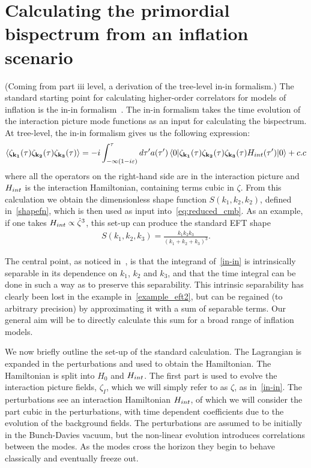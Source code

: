     \section{Calculating the primordial bispectrum from an inflation scenario}
    (Coming from part iii level, a derivation of the tree-level in-in formalism.)
    The standard starting point for calculating
higher-order correlators for models of inflation is the in-in formalism~\cite{Maldacena,weinberg_in_in}.
The in-in formalism takes the time evolution of the interaction picture mode
functions as an input for calculating the bispectrum.
At tree-level, the in-in formalism gives us the
following expression:
\begin{align}
{
    \left< \zeta_{\mathbf{k_1}}(\tau)\zeta_{\mathbf{k_2}}(\tau)\zeta_{\mathbf{k_3}}(\tau) \right>
=-i\int_{-\infty(1-i\varepsilon)}^{\tau}d\tau'a(\tau')
    \left<0\lvert \zeta_{\mathbf{k_1}}(\tau)\zeta_{\mathbf{k_2}}(\tau)\zeta_{\mathbf{k_3}}(\tau)H_{int}(\tau') \rvert0\right>+c.c\label{in-in}
}
\end{align}
where all the operators on the right-hand side are in the interaction picture
and $H_{int}$ is the interaction Hamiltonian, containing terms cubic in $\zeta$.
From this calculation we obtain the dimensionless shape function $S(k_1,k_2,k_2)$,
defined in~\eqref{shapefn},
which is then used as input into~\eqref{eq:reduced_cmb}.
As an example, if one takes $H_{int}\propto\dot{\zeta}^3$, this set-up can produce the standard EFT shape
\begin{align}\label{example_eft2}
    S(k_1, k_2, k_3) = \frac{k_1k_2k_3}{(k_1+k_2+k_3)^3}.
\end{align}

The central point, as noticed in~\cite{Funakoshi}, is that the
integrand of~\eqref{in-in} is intrinsically separable
in its dependence on $k_1$, $k_2$ and $k_3$, and that the time integral
can be done in such a way as to preserve this separability.
This intrinsic separability has clearly been lost in
the example in~\eqref{example_eft2},
but can be regained (to arbitrary precision) by approximating it
with a sum of separable terms. Our general aim will be to directly calculate
this sum for a broad range of inflation models.

We now briefly outline the set-up of the standard calculation.
The Lagrangian is expanded in the perturbations and used to obtain the Hamiltonian.
The Hamiltonian is split into $H_0$ and $H_{int}$.
The first part is used to evolve the interaction picture fields, $\zeta_I$,
which we will simply refer to as $\zeta$, as in~\eqref{in-in}.
The perturbations see an interaction Hamiltonian $H_{int}$,
of which we will consider the part cubic in the perturbations,
with time dependent coefficients due to the evolution of the background fields.
The perturbations are assumed to be initially in the Bunch-Davies vacuum,
but the non-linear
evolution introduces correlations between the modes.
As the modes cross the horizon they begin to behave classically
and eventually freeze out.


